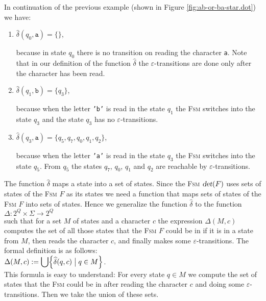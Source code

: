 \exampleEng
In continuation of the previous example (shown in Figure \ref{fig:ab-or-ba-star.dot}) we have:
\begin{enumerate}
\item $\widehat{\delta}(q_0, \texttt{a}) = \{\}$,
  
      because in state $q_0$ there is no transition on reading the character \texttt{a}.
      Note that in our definition of the function  $\widehat{\delta}$ the 
      $\varepsilon$-transitions are done only after the character has been read.
\item $\widehat{\delta}(q_1, \texttt{b}) = \{q_3\}$,

      because when the letter \texttt{'b'} is read in the state $q_1$ the \textsc{Fsm}
      switches into the state $q_3$ and the state $q_3$ has no  $\varepsilon$-transitions.
\item $\widehat{\delta}(q_3, \texttt{a}) = \{q_5, q_7, q_0, q_1, q_2\}$,

      because when the letter \texttt{'a'} is read in the state $q_3$ the \textsc{Fsm}
      switches into the state $q_5$.  From $q_5$ the states $q_7$, $q_0$, $q_1$ and $q_2$
      are reachable by $\varepsilon$-transitions. \eox
\end{enumerate}
The function  $\widehat{\delta}$ maps a state into a set of states.  Since the \textsc{Fsm} $\textsl{det}(F)$ uses
sets of states of the \textsc{Fsm} $F$ as its states we need a function that maps sets of states of the
\textsc{Fsm} $F$ into sets of states.  Hence we generalize 
the function $\widehat{\delta}$ to the function
\\[0.2cm]
\hspace*{1.3cm}
$\Delta: 2^Q \times \Sigma \rightarrow 2^Q$
\\[0.2cm]
such that for a set $M$ of states and a character $c$ the expression $\Delta(M, c)$
computes the set of all those states that the \textsc{Fsm} $F$ could be in if it is in a state from $M$, then
reads the character $c$, and finally makes some $\varepsilon$-transitions.
The formal definition is as follows: 
\\[0.2cm]
\hspace*{1.3cm}
$\displaystyle \Delta(M,c) := \bigcup \Bigl\{ \widehat{\delta}(q,c) \bigm| q \in M \Bigr\}$. 
\\[0.2cm]
This formula is easy to understand:  For every state  $q \in M$ we compute the set of states that the
\textsc{Fsm} could be in after reading the character $c$ and doing some 
$\varepsilon$-transitions.  Then we take the union of these sets.

